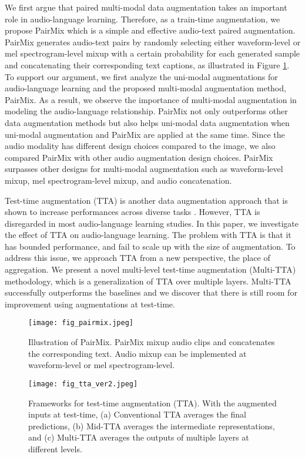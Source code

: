 \documentclass{INTERSPEECH2023}
\begin{document}
We first argue that paired multi-modal data augmentation takes an important role in audio-language learning. Therefore, as a train-time augmentation, we propose PairMix which is a simple and effective audio-text paired augmentation. 
PairMix generates audio-text pairs by randomly selecting either waveform-level or mel spectrogram-level mixup with a certain probability for each generated sample and concatenating their corresponding text captions, as illustrated in Figure \ref{fig:mixgen}. 
To support our argument, we first analyze the uni-modal augmentations for audio-language learning and the proposed multi-modal augmentation method, PairMix. As a result, we observe the importance of multi-modal augmentation in modeling the audio-language relationship. PairMix not only outperforms other data augmentation methods but also helps uni-modal data augmentation when uni-modal augmentation and PairMix are applied at the same time. 
Since the audio modality has different design choices compared to the image, we also compared PairMix with other audio augmentation design choices. PairMix surpasses other designs for multi-modal augmentation such as waveform-level mixup, mel spectrogram-level mixup, and audio concatenation.

Test-time augmentation (TTA) is another data augmentation approach that is shown to increase performances across diverse tasks \cite{moshkov2020test, molchanov2020greedy}. However, TTA is disregarded in most audio-language learning studies. In this paper, we investigate the effect of TTA on audio-language learning. The problem with TTA is that it has bounded performance, and fail to scale up with the size of augmentation.
To address this issue, we approach TTA from a new perspective, the place of aggregation. We present a novel multi-level test-time augmentation (Multi-TTA) methodology, which is a generalization of TTA over multiple layers. Multi-TTA successfully outperforms the baselines and we discover that there is still room for improvement using augmentations at test-time.

\begin{figure}
    \centering
    \texttt{[image: fig\_pairmix.jpeg]}
    \caption{Illustration of PairMix. PairMix mixup audio clips and concatenates the corresponding text. Audio mixup can be implemented at waveform-level or mel spectrogram-level.} \label{fig:mixgen}
\end{figure}

\begin{figure*}
    \centering
    \texttt{[image: fig\_tta\_ver2.jpeg]}
    \caption{Frameworks for test-time augmentation (TTA). With the augmented inputs at test-time, (a) Conventional TTA averages the final predictions, (b) Mid-TTA averages the intermediate representations, and (c) Multi-TTA averages the outputs of multiple layers at different levels.}
    \label{fig:tta}
\end{figure*}
\end{document}
